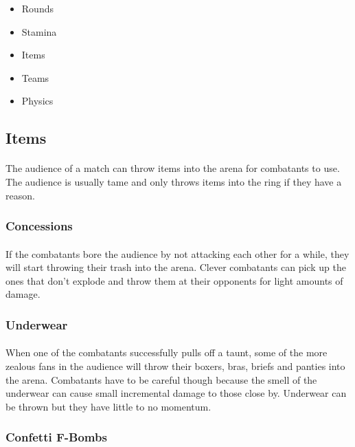 \begin{itemize}
    \item Rounds
    \item Stamina
    \item Items
    \item Teams
    \item Physics
\end{itemize}

\subsection{Items}

\paragraph{} The audience of a match can throw items into the arena for combatants to use. The audience is usually tame and only throws items into the ring if they have a reason.

\subsubsection{Concessions}

\paragraph{} If the combatants bore the audience by not attacking each other for a while, they will start throwing their trash into the arena. Clever combatants can pick up the ones that don't explode and throw them at their opponents for light amounts of damage.

\subsubsection{Underwear}

\paragraph{} When one of the combatants successfully pulls off a taunt, some of the more zealous fans in the audience will throw their boxers, bras, briefs and panties into the arena. Combatants have to be careful though because the smell of the underwear can cause small incremental damage to those close by. Underwear can be thrown but they have little to no momentum.

\subsubsection{Confetti F-Bombs}

